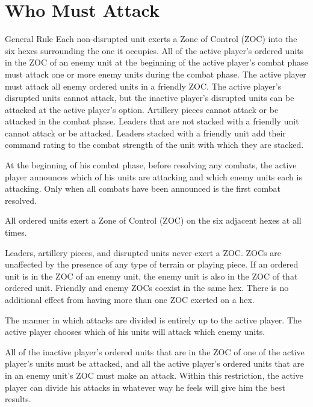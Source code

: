 \columnbreak
\section{Who Must Attack}

\begin{rulebox}{General Rule}
Each non-disrupted unit exerts a Zone of Control (ZOC) into the six hexes surrounding the one it occupies. All of the active player's ordered units in the ZOC of an enemy unit at the beginning of the active player's combat phase must attack one or more enemy units during the combat phase. The active player must attack all enemy ordered units in a friendly ZOC. The active player's disrupted units cannot attack, but the inactive player's disrupted units can be attacked at the active player's option. Artillery pieces cannot attack or be attacked in the combat phase. Leaders that are not stacked with a friendly unit cannot attack or be attacked. Leaders stacked with a friendly unit add their command rating to the combat strength of the unit with which they are stacked.
\end{rulebox}


At the beginning of his combat phase, before resolving any combats, the active player announces which of his units are attacking and which enemy units each is attacking. Only when all combats have been announced is the first combat resolved.

 All ordered units exert a Zone of Control (ZOC) on the six adjacent hexes at all times.

Leaders, artillery pieces, and disrupted units never exert a ZOC. ZOCs are unaffected by the presence of any type of terrain or playing piece. If an ordered unit is in the ZOC of an enemy unit, the enemy unit is also in the ZOC of that ordered unit. Friendly and enemy ZOCs coexist in the same hex. There is no additional effect from having more than one ZOC exerted on a hex.

 The manner in which attacks are divided is entirely up to the active player. The active player chooses which of his units will attack which enemy units.

All of the inactive player's ordered units that are in the ZOC of one of the active player's units must be attacked, and all the active player's ordered units that are in an enemy unit's ZOC must make an attack. Within this restriction, the active player can divide his attacks in whatever way he feels will give him the best results.

